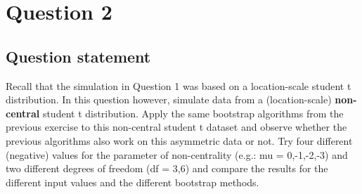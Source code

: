 \documentclass[12pt]{article}
\begin{document}
\newpage

\section{Question 2}
\subsection*{Question statement}
Recall that the simulation in Question 1 was based on a location-scale student t distribution. In this question however, simulate data from a (location-scale) \textbf{non-central} student t distribution. Apply the same bootstrap algorithms from the previous exercise to this non-central student t dataset and observe whether the previous algorithms also work on this asymmetric data or not.
\newline Try four different (negative) values for the parameter of non-centrality (e.g.: mu = 0,-1,-2,-3) and two different degrees of freedom (df = 3,6) and compare the results for the different input values and the different bootstrap methods.
\end{document}
